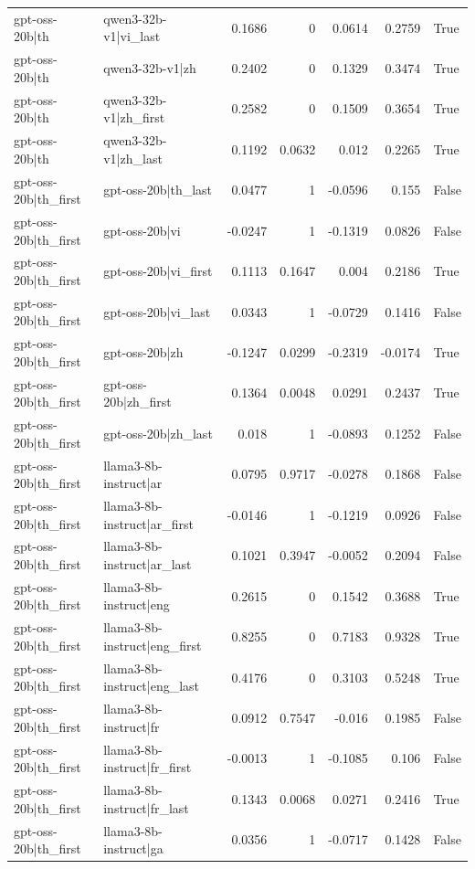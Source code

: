\begin{table}
\begin{tabular}{l l r r r r l}
gpt-oss-20b|th & qwen3-32b-v1|vi_last & 0.1686 & 0 & 0.0614 & 0.2759 & True \\
gpt-oss-20b|th & qwen3-32b-v1|zh & 0.2402 & 0 & 0.1329 & 0.3474 & True \\
gpt-oss-20b|th & qwen3-32b-v1|zh_first & 0.2582 & 0 & 0.1509 & 0.3654 & True \\
gpt-oss-20b|th & qwen3-32b-v1|zh_last & 0.1192 & 0.0632 & 0.012 & 0.2265 & True \\
gpt-oss-20b|th_first & gpt-oss-20b|th_last & 0.0477 & 1 & -0.0596 & 0.155 & False \\
gpt-oss-20b|th_first & gpt-oss-20b|vi & -0.0247 & 1 & -0.1319 & 0.0826 & False \\
gpt-oss-20b|th_first & gpt-oss-20b|vi_first & 0.1113 & 0.1647 & 0.004 & 0.2186 & True \\
gpt-oss-20b|th_first & gpt-oss-20b|vi_last & 0.0343 & 1 & -0.0729 & 0.1416 & False \\
gpt-oss-20b|th_first & gpt-oss-20b|zh & -0.1247 & 0.0299 & -0.2319 & -0.0174 & True \\
gpt-oss-20b|th_first & gpt-oss-20b|zh_first & 0.1364 & 0.0048 & 0.0291 & 0.2437 & True \\
gpt-oss-20b|th_first & gpt-oss-20b|zh_last & 0.018 & 1 & -0.0893 & 0.1252 & False \\
gpt-oss-20b|th_first & llama3-8b-instruct|ar & 0.0795 & 0.9717 & -0.0278 & 0.1868 & False \\
gpt-oss-20b|th_first & llama3-8b-instruct|ar_first & -0.0146 & 1 & -0.1219 & 0.0926 & False \\
gpt-oss-20b|th_first & llama3-8b-instruct|ar_last & 0.1021 & 0.3947 & -0.0052 & 0.2094 & False \\
gpt-oss-20b|th_first & llama3-8b-instruct|eng & 0.2615 & 0 & 0.1542 & 0.3688 & True \\
gpt-oss-20b|th_first & llama3-8b-instruct|eng_first & 0.8255 & 0 & 0.7183 & 0.9328 & True \\
gpt-oss-20b|th_first & llama3-8b-instruct|eng_last & 0.4176 & 0 & 0.3103 & 0.5248 & True \\
gpt-oss-20b|th_first & llama3-8b-instruct|fr & 0.0912 & 0.7547 & -0.016 & 0.1985 & False \\
gpt-oss-20b|th_first & llama3-8b-instruct|fr_first & -0.0013 & 1 & -0.1085 & 0.106 & False \\
gpt-oss-20b|th_first & llama3-8b-instruct|fr_last & 0.1343 & 0.0068 & 0.0271 & 0.2416 & True \\
gpt-oss-20b|th_first & llama3-8b-instruct|ga & 0.0356 & 1 & -0.0717 & 0.1428 & False \\

\end{tabular}
\end{table}
